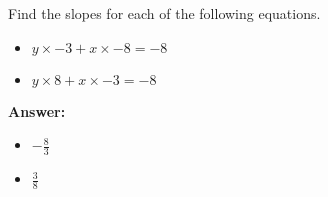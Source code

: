  Find the slopes for each of the following equations. \begin{itemize}\item \( y \times -3 + x \times -8 = -8 \)\item \( y \times 8 + x \times -3 = -8 \)\end{itemize}

        \textbf{Answer:} \begin{itemize}\item \( -\frac{8}{3} \)\item \( \frac{3}{8} \)\end{itemize}
